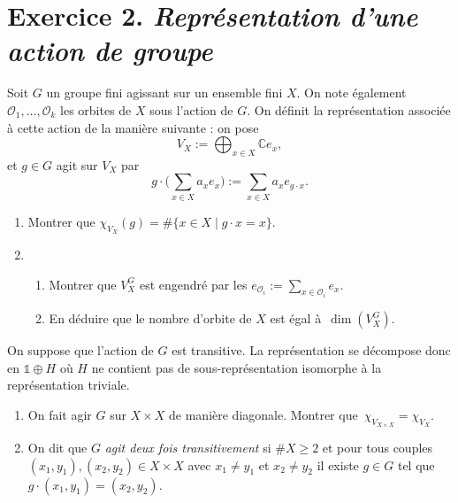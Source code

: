 \documentclass[./main]{subfiles}
\begin{document}
  \section{Exercice 2. \textit{Représentation d'une action de groupe}}

  \begin{enonce}
    Soit $G$ un groupe fini agissant sur un ensemble fini $X$. On note également~$\mathcal{O}_1, \ldots, \mathcal{O}_k$ les orbites de $X$ sous l'action de $G$.
    On définit la représentation associée à cette action de la manière suivante : on pose \[
      V_X := \bigoplus_{x \in X} \mathds{C} e_x
    ,\] et $g \in G$ agit sur $V_X$ par \[
    g \cdot \Big(\sum_{x \in X} a_x e_x\Big) := \sum_{x \in X} a_x e_{g\cdot x}
    .\]
    \begin{enumerate}
      \item Montrer que $\chi_{V_X}(g) = \# \{x \in X  \mid  g \cdot x = x\}$.
      \item
        \begin{enumerate}
          \item Montrer que $V_X^G$ est engendré par les $e_{\mathcal{O}_i} := \sum_{x \in \mathcal{O}_i} e_x$.
          \item En déduire que le nombre d'orbite de $X$ est égal à~$\dim(V_X^G)$.
        \end{enumerate}
    \end{enumerate}
    On suppose que l'action de $G$ est transitive. La représentation se décompose donc en $\mathds{1} \oplus H$ où $H$ ne contient pas de sous-représentation isomorphe à la représentation triviale.
    \begin{enumerate}[resume*]
      \item On fait agir $G$ sur $X \times X$ de manière diagonale. Montrer que~$\chi_{V_{X\times X}} = \chi_{V_X}$.
      \item On dit que $G$ \textit{agit deux fois transitivement} si $\# X \ge 2$ et pour tous couples $(x_1, y_1), (x_2, y_2) \in X \times X$ avec $x_1 \neq y_1$ et $x_2 \neq y_2$ il existe $g \in G$ tel que $g \cdot (x_1, y_1) = (x_2, y_2)$.


\end{enumerate}
\end{enonce}
\end{document}
